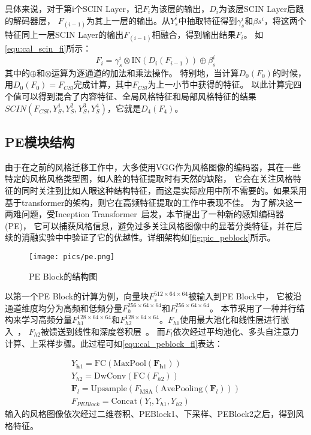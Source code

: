 具体来说，对于第i个SCIN Layer，记$F_i$为该层的输出，$D_i$为该层SCIN Layer后跟的解码器层， 
$F_{(i-1)}$为其上一层的输出。从$Y_s^i$中抽取特征得到\(\gamma_{s}^{i}\)和\(\beta{s}^{i}\)，将这两个特征同上一层SCIN Layer的输出$F_{(i-1)}$相融合，得到输出结果$F_i$。
如\autoref{equ:cal_scin_fi}所示：
\begin{equation}
    \label{equ:cal_scin_fi}
    F_i=\gamma_s^i\otimes\mathrm{IN}(D_i(F_{i-1}))\oplus\beta_s^i
\end{equation}
其中的$\oplus$和$\otimes$运算为逐通道的加法和乘法操作。
特别地，当计算\(D_0(F_0)\)的时候，用\(D_0(F_0)=F_{CSl}\)完成计算，其中$F_{CSl}$为上一小节中获得的特征。
以此计算完四个值可以得到混合了内容特征、全局风格特征和局部风格特征的结果\(SCIN(F_{CSl},Y_S^1,Y_S^2,Y_S^3,Y_S^4)\)，它就是\(D_4(F_4)\)。

\subsection{PE模块结构}

由于在之前的风格迁移工作中，大多使用VGG作为风格图像的编码器，其在一些特定的风格风格类型图，如人脸的特征提取时有天然的缺陷，
它会在关注风格特征的同时关注到比如人眼这种结构特征，而这是实际应用中所不需要的。如果采用基于transformer的架构，则它在高频特征提取的工作中表现不佳。
为了解决这一两难问题，受Inception Transformer~\cite{si2022inception}启发，本节提出了一种新的感知编码器(PE)，
它可以捕获风格信息，避免过多关注风格图像中的显著分类特征，并在后续的消融实验中中验证了它的优越性。详细架构如\autoref{fig:pic_peblock}所示。
\begin{figure}[h]
    \centering
    \texttt{[image: pics/pe.png]}
    \caption{\label{fig:pic_peblock}PE Block的结构图}
\end{figure}
以第一个PE Block的计算为例，向量块\(F_s^{512\times64\times64}\)被输入到PE Block中，
它被沿通道维度均分为高频和低频分量\(F_h^{256\times64\times64}\text{和}F_l^{256\times64\times64}\)。
本节采用了一种并行结构来学习高频分量\(F_{h1}^{128\times64\times64}\text{和}F_{h2}^{128\times64\times64}\)。$F_{h1}$使用最大池化和线性层进行嵌入~\cite{szegedy2015going}，
$F_{h2}$被馈送到线性和深度卷积层~\cite{mamalet2012simplifying,chollet2017xception}。
而$F_l$依次经过平均池化、多头自注意力计算、上采样步骤。此过程可如\autoref{equ:cal_peblock_fl}表达：

\begin{equation}
    \label{equ:cal_peblock_fl}
    \begin{gathered}
        Y_{\boldsymbol{h}1}=\mathrm{FC}(\mathrm{MaxPool}(\boldsymbol{F}_{\boldsymbol{h}1})) \\
        Y_{h2}=\mathrm{DwConv}(\mathrm{FC}(F_{h2})) \\
        \boldsymbol{F}_{l}=\mathrm{Upsample}\left(F_{\mathrm{MSA}}(\mathrm{AvePooling}(\boldsymbol{F}_{l}))\right) \\
        F_{PE Block}=\mathrm{Concat}(Y_l,Y_{h1},Y_{h2})
        \end{gathered}
\end{equation}
输入的风格图像依次经过二维卷积、PEBlock1、下采样、PEBlock2之后，得到风格特征。

